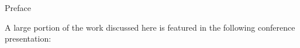 \begin{plainchp}{Preface}
    \begin{refsection}
    \lipsum[1]

    A large portion of the work discussed here is featured in the following conference presentation:\\
    \end{refsection}
\end{plainchp}